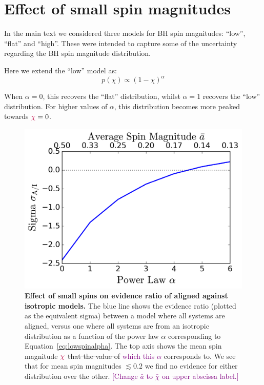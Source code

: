 \documentclass[modern,linenumbers]{aastex61}
\newcommand{\ilya}[1]{\textcolor{purple}{#1}}
\begin{document}
\section{Effect of small spin magnitudes}
\label{sec:smallspins}

In the main text we considered three models for BH spin magnitudes: ``low'', ``flat'' and ``high''. These were intended to capture some of the uncertainty regarding the BH spin magnitude distribution.

Here we extend the ``low'' model as:
%
\begin{equation}
p(\chi) \propto (1 - \chi)^{\alpha}
\label{eq:lowspinalpha}
\end{equation}
%

When $\alpha = 0$, this recovers the ``flat'' distribution, whilst $\alpha = 1$
recovers the ``low'' distribution. For higher values of $\alpha$, this distribution 
becomes more peaked towards $\ilya{\chi} = 0$.

%
\begin{figure}
\centering
\includegraphics[width=\textwidth]{../plots/sigma_v_alpha.png}
\caption{\textbf{Effect of small spins on evidence ratio of aligned against isotropic models.} The blue line shows the evidence ratio (plotted as the equivalent sigma) between a model where all systems are aligned, versus one where all systems are from an isotropic distribution as a function of the power law $\alpha$ corresponding to Equation~\ref{eq:lowspinalpha}.  The top axis shows the mean spin magnitude $\ilya{\chi}$
 \sout{that the value of} \ilya{which this $\alpha$} corresponds to. We see that for mean spin magnitudes $\lesssim 0.2$ we find no evidence for either distribution over the other.  \ilya{[Change $\bar{a}$ to $\bar{\chi}$ on upper abscissa label.]}}
\label{fig:smallspinsalpha}
\end{figure}
%
\end{document}
